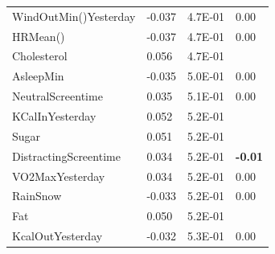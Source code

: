 \documentclass[conference]{IEEEtran}
\begin{document}
\begin{table}[]
\begin{tabular}{llll}
WindOutMin()Yesterday          & -0.037 & 4.7E-01          & 0.00           \\
HRMean()                       & -0.037 & 4.7E-01          & 0.00           \\
Cholesterol                    & 0.056  & 4.7E-01          &                \\
AsleepMin                      & -0.035 & 5.0E-01          & 0.00           \\
NeutralScreentime              & 0.035  & 5.1E-01          & 0.00           \\
KCalInYesterday                & 0.052  & 5.2E-01          &                \\
Sugar                          & 0.051  & 5.2E-01          &                \\
DistractingScreentime          & 0.034  & 5.2E-01          & \textbf{-0.01} \\
VO2MaxYesterday                & 0.034  & 5.2E-01          & 0.00           \\
RainSnow                       & -0.033 & 5.2E-01          & 0.00           \\
Fat                            & 0.050  & 5.2E-01          &                \\
KcalOutYesterday               & -0.032 & 5.3E-01          & 0.00           \\
\end{tabular}
\end{table}
\end{document}
